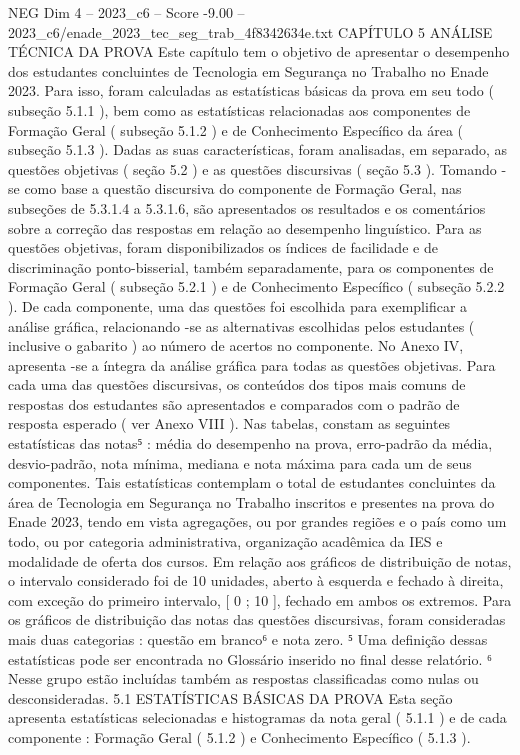 \begin{textsample}{NEG Dim 4 – 2023\_c6 – Score -9.00 – 2023\_c6/enade\_2023\_tec\_seg\_trab\_4f8342634e.txt}  \label{ex:f4_neg_006}
CAPÍTULO 5 ANÁLISE TÉCNICA DA PROVA Este capítulo tem o objetivo de apresentar o desempenho dos estudantes concluintes de Tecnologia em Segurança no Trabalho no Enade 2023.
Para isso, foram calculadas as estatísticas básicas da prova em seu todo ( subseção 5.1.1 ), bem como as estatísticas relacionadas aos componentes de Formação Geral ( subseção 5.1.2 ) e de Conhecimento Específico da área ( subseção 5.1.3 ).
Dadas as suas características, foram analisadas, em separado, as questões objetivas ( seção 5.2 ) e as questões discursivas ( seção 5.3 ).
Tomando -se como base a questão discursiva do componente de Formação Geral, nas subseções de 5.3.1.4 a 5.3.1.6, são apresentados os resultados e os comentários sobre a correção das respostas em relação ao desempenho linguístico.
Para as questões objetivas, foram disponibilizados os índices de facilidade e de discriminação ponto-bisserial, também separadamente, para os componentes de Formação Geral ( subseção 5.2.1 ) e de Conhecimento Específico ( subseção 5.2.2 ).
De cada componente, uma das questões foi escolhida para exemplificar a análise gráfica, relacionando -se as alternativas escolhidas pelos estudantes ( inclusive o gabarito ) ao número de acertos no componente.
No Anexo IV, apresenta -se a íntegra da análise gráfica para todas as questões objetivas.
Para cada uma das questões discursivas, os conteúdos dos tipos mais comuns de respostas dos estudantes são apresentados e comparados com o padrão de resposta esperado ( ver Anexo VIII ).
Nas tabelas, constam as seguintes estatísticas das notas⁵ : média do desempenho na prova, erro-padrão da média, desvio-padrão, nota mínima, mediana e nota máxima para cada um de seus componentes.
Tais estatísticas contemplam o total de estudantes concluintes da área de Tecnologia em Segurança no Trabalho inscritos e presentes na prova do Enade 2023, tendo em vista agregações, ou por grandes regiões e o país como um todo, ou por categoria administrativa, organização acadêmica da IES e modalidade de oferta dos cursos.
Em relação aos gráficos de distribuição de notas, o intervalo considerado foi de 10 unidades, aberto à esquerda e fechado à direita, com exceção do primeiro intervalo, [ 0 ; 10 ], fechado em ambos os extremos.
Para os gráficos de distribuição das notas das questões discursivas, foram consideradas mais duas categorias : questão em branco⁶ e nota zero. ⁵ Uma definição dessas estatísticas pode ser encontrada no Glossário inserido no final desse relatório. ⁶ Nesse grupo estão incluídas também as respostas classificadas como nulas ou desconsideradas. 5.1 ESTATÍSTICAS BÁSICAS DA PROVA Esta seção apresenta estatísticas selecionadas e histogramas da nota geral ( 5.1.1 ) e de cada componente : Formação Geral ( 5.1.2 ) e Conhecimento Específico ( 5.1.3 ).

\end{textsample}
